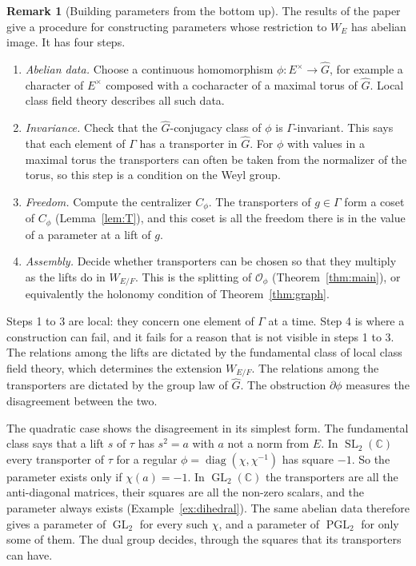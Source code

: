 \documentclass[12pt,letterpaper]{article}
\numberwithin{equation}{section}
\theoremstyle{plain}
\theoremstyle{definition}
\newtheorem{remark}[theorem]{Remark}
\newcommand{\C}{\mathbb{C}}
\newcommand{\Gh}{\widehat{G}}
\DeclareMathOperator{\GL}{GL}
\DeclareMathOperator{\SL}{SL}
\DeclareMathOperator{\PGL}{PGL}
\DeclareMathOperator{\diag}{diag}
\begin{document}
\begin{remark}[Building parameters from the bottom up]\label{rem:bottomup}
The results of the paper give a procedure for constructing parameters
whose restriction to $W_E$ has abelian image. It has four steps.
\begin{enumerate}[itemsep=1pt]
\item \emph{Abelian data.} Choose a continuous homomorphism
$\phi:E^\times\to\Gh$, for example a character of $E^\times$ composed
with a cocharacter of a maximal torus of $\Gh$. Local class field theory
describes all such data.
\item \emph{Invariance.} Check that the $\Gh$-conjugacy class of $\phi$
is $\Gamma$-invariant. This says that each element of $\Gamma$ has a
transporter in $\Gh$. For $\phi$ with values in a
maximal torus the transporters can often be taken from the normalizer of
the torus, so this step is a condition on the Weyl group.
\item \emph{Freedom.} Compute the centralizer $C_\phi$. The transporters
of $g\in\Gamma$ form a coset of $C_\phi$ (Lemma~\ref{lem:T}), and this coset is all the
freedom there is in the value of a parameter at a lift of $g$.
\item \emph{Assembly.} Decide whether transporters can be chosen so that
they multiply as the lifts do in $W_{E/F}$. This is the splitting of
$\mathcal{O}_\phi$ (Theorem~\ref{thm:main}), or equivalently the
holonomy condition of Theorem~\ref{thm:graph}.
\end{enumerate}
Steps 1 to 3 are local: they concern one element of $\Gamma$ at a time.
Step 4 is where a construction can fail, and it fails for a reason that
is not visible in steps 1 to 3. The relations among the lifts are
dictated by the fundamental class of local class field theory, which
determines the extension $W_{E/F}$. The relations among the transporters
are dictated by the group law of $\Gh$. The obstruction $\partial\phi$
measures the disagreement between the two.

The quadratic case shows the disagreement in its simplest form. The
fundamental class says that a lift $s$ of $\tau$ has $s^2=a$ with $a$
not a norm from $E$. In $\SL_2(\C)$ every transporter of $\tau$ for a
regular $\phi=\diag(\chi,\chi^{-1})$ has square $-1$. So the parameter
exists only if $\chi(a)=-1$. In $\GL_2(\C)$ the transporters are all the
anti-diagonal matrices, their squares are all the non-zero scalars, and
the parameter always exists (Example~\ref{ex:dihedral}). The same
abelian data therefore gives a parameter of $\GL_2$ for every such
$\chi$, and a parameter of $\PGL_2$ for only some of them. The dual
group decides, through the squares that its transporters can have.
\end{remark}
\end{document}
